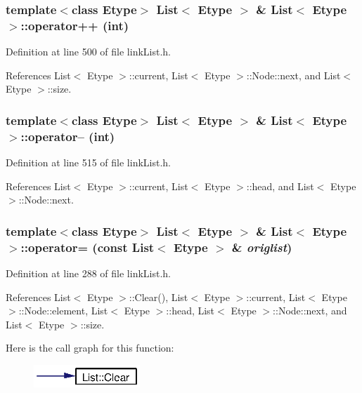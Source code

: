 \subsubsection{\setlength{\rightskip}{0pt plus 5cm}template$<$class Etype$>$ {\bf List}$<$ Etype $>$ \& {\bf List}$<$ Etype $>$::operator++ (int)}\label{classList_a13}




Definition at line 500 of file link\-List.h.

References List$<$ Etype $>$::current, List$<$ Etype $>$::Node::next, and List$<$ Etype $>$::size.
\subsubsection{\setlength{\rightskip}{0pt plus 5cm}template$<$class Etype$>$ {\bf List}$<$ Etype $>$ \& {\bf List}$<$ Etype $>$::operator-- (int)}\label{classList_a14}




Definition at line 515 of file link\-List.h.

References List$<$ Etype $>$::current, List$<$ Etype $>$::head, and List$<$ Etype $>$::Node::next.
\subsubsection{\setlength{\rightskip}{0pt plus 5cm}template$<$class Etype$>$ {\bf List}$<$ Etype $>$ \& {\bf List}$<$ Etype $>$::operator= (const {\bf List}$<$ Etype $>$ \& {\em origlist})}\label{classList_a5}




Definition at line 288 of file link\-List.h.

References List$<$ Etype $>$::Clear(), List$<$ Etype $>$::current, List$<$ Etype $>$::Node::element, List$<$ Etype $>$::head, List$<$ Etype $>$::Node::next, and List$<$ Etype $>$::size.

Here is the call graph for this function:\begin{figure}[H]
\begin{center}
\leavevmode
\includegraphics[width=113pt]{classList_a5_cgraph}
\end{center}
\end{figure}
